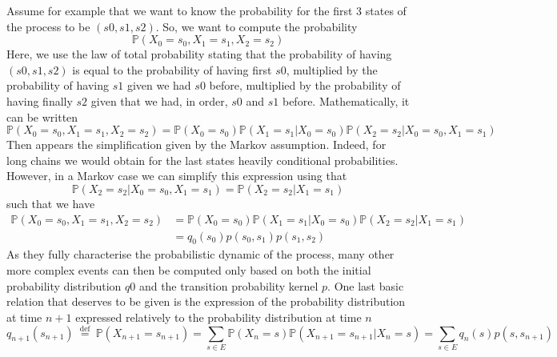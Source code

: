 Assume for example that we want to know the probability for the first 3 states of the process to be $(s0, s1, s2)$. So, we want to compute the probability
\begin{equation}\mathbb{P}\left(X_{0}=s_{0}, X_{1}=s_{1}, X_{2}=s_{2}\right)\end{equation}
Here, we use the law of total probability stating that the probability of having $(s0, s1, s2)$ is equal to the probability of having first $s0$, multiplied by the probability of having $s1$ given we had $s0$ before, multiplied by the probability of having finally $s2$ given that we had, in order, $s0$ and $s1$ before. Mathematically, it can be written
\begin{equation}\mathbb{P}\left(X_{0}=s_{0}, X_{1}=s_{1}, X_{2}=s_{2}\right)=\mathbb{P}\left(X_{0}=s_{0}\right) \mathbb{P}\left(X_{1}=s_{1} | X_{0}=s_{0}\right) \mathbb{P}\left(X_{2}=s_{2} | X_{0}=s_{0}, X_{1}=s_{1}\right)\end{equation}
Then appears the simplification given by the Markov assumption. Indeed, for long chains we would obtain for the last states heavily conditional probabilities. However, in a Markov case we can simplify this expression using that
\begin{equation}\mathbb{P}\left(X_{2}=s_{2} | X_{0}=s_{0}, X_{1}=s_{1}\right)=\mathbb{P}\left(X_{2}=s_{2} | X_{1}=s_{1}\right)\end{equation}
such that we have
\begin{equation}\begin{aligned}
\mathbb{P}\left(X_{0}=s_{0}, X_{1}=s_{1}, X_{2}=s_{2}\right) &=\mathbb{P}\left(X_{0}=s_{0}\right) \mathbb{P}\left(X_{1}=s_{1} | X_{0}=s_{0}\right) \mathbb{P}\left(X_{2}=s_{2} | X_{1}=s_{1}\right) \\
&=q_{0}\left(s_{0}\right) p\left(s_{0}, s_{1}\right) p\left(s_{1}, s_{2}\right)
\end{aligned}\end{equation}
As they fully characterise the probabilistic dynamic of the process, many other more complex events can then be computed only based on both the initial probability distribution $q0$ and the transition probability kernel $p$. One last basic relation that deserves to be given is the expression of the probability distribution at time $n+1$ expressed relatively to the probability distribution at time $n$
\begin{equation}q_{n+1}\left(s_{n+1}\right) \stackrel{\text { def }}{=} \mathbb{P}\left(X_{n+1}=s_{n+1}\right)=\sum_{s \in E} \mathbb{P}\left(X_{n}=s\right) \mathbb{P}\left(X_{n+1}=s_{n+1} | X_{n}=s\right)=\sum_{s \in E} q_{n}(s) p\left(s, s_{n+1}\right)\end{equation}

